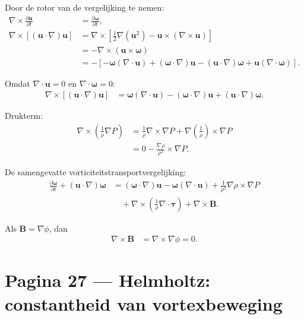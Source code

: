 \documentclass[11pt]{article}
\newcommand{\pd}[2]{\frac{\partial #1}{\partial #2}}
\newcommand{\vect}[1]{\mathbf{#1}}
\begin{document}
Door de rotor van de vergelijking te nemen:
\begin{align*}
\nabla\times\pd{\vect{u}}{t}
  &=
  \pd{\bm{\omega}}{t},
\\
\nabla\times\left[\left(\vect{u}\cdot\nabla\right)\vect{u}\right]
  &=
  \nabla\times\left[
  \frac{1}{2}\nabla\left(\vect{u}^2\right)
  -\vect{u}\times\left(\nabla\times\vect{u}\right)
  \right]
\\
  &=
  -\nabla\times\left(\vect{u}\times\bm{\omega}\right)
\\
  &=
  -\left[
  -\bm{\omega}\left(\nabla\cdot\vect{u}\right)
  +\left(\bm{\omega}\cdot\nabla\right)\vect{u}
  -\left(\vect{u}\cdot\nabla\right)\bm{\omega}
  +\vect{u}\left(\nabla\cdot\bm{\omega}\right)
  \right].
\end{align*}

Omdat $\nabla\cdot\vect{u}=0$ en $\nabla\cdot\bm{\omega}=0$:
\begin{align*}
\nabla\times\left[\left(\vect{u}\cdot\nabla\right)\vect{u}\right]
  &=
  \bm{\omega}\left(\nabla\cdot\vect{u}\right)
  -\left(\bm{\omega}\cdot\nabla\right)\vect{u}
  +\left(\vect{u}\cdot\nabla\right)\bm{\omega}.
\end{align*}

Drukterm:
\begin{align*}
\nabla\times\left(\frac{1}{\rho}\nabla P\right)
&=
\frac{1}{\rho}\nabla\times\nabla P
+
\nabla\left(\frac{1}{\rho}\right)\times\nabla P
\\
&=
0-\frac{\nabla\rho}{\rho^2}\times\nabla P.
\end{align*}

De samengevatte vorticiteitstransportvergelijking:
\begin{align*}
\pd{\bm{\omega}}{t}
+\left(\vect{u}\cdot\nabla\right)\bm{\omega}
&=
\left(\bm{\omega}\cdot\nabla\right)\vect{u}
-\bm{\omega}\left(\nabla\cdot\vect{u}\right)
+\frac{1}{\rho^2}\nabla\rho\times\nabla P
\\
&\quad
+\nabla\times\left(\frac{1}{\rho}\nabla\cdot\bm{\tau}\right)
+\nabla\times\vect{B}.
\end{align*}

Als $\vect{B}=\nabla\phi$, dan
\begin{align*}
\nabla\times\vect{B}
  &=
  \nabla\times\nabla\phi
  =
  0.
\end{align*}

\newpage

\section*{Pagina 27 --- Helmholtz: constantheid van vortexbeweging}
\end{document}

